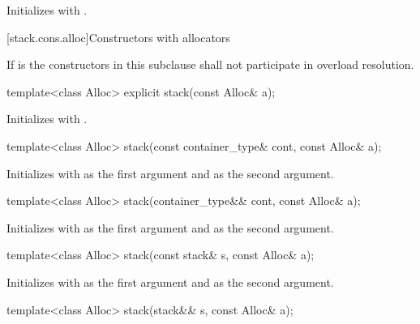 \begin{itemdescr}
\pnum
\effects
Initializes  with .
\end{itemdescr}

[stack.cons.alloc]{Constructors with allocators}

\pnum
If  is 
the constructors in this subclause shall not participate in overload resolution.

%
\begin{itemdecl}
template<class Alloc> explicit stack(const Alloc& a);
\end{itemdecl}

\begin{itemdescr}
\pnum
\effects
Initializes  with .
\end{itemdescr}

%
\begin{itemdecl}
template<class Alloc> stack(const container_type& cont, const Alloc& a);
\end{itemdecl}

\begin{itemdescr}
\pnum
\effects
Initializes  with  as the first argument and  as the
second argument.
\end{itemdescr}

%
\begin{itemdecl}
template<class Alloc> stack(container_type&& cont, const Alloc& a);
\end{itemdecl}

\begin{itemdescr}
\pnum
\effects
Initializes  with  as the first argument and 
as the second argument.
\end{itemdescr}

%
\begin{itemdecl}
template<class Alloc> stack(const stack& s, const Alloc& a);
\end{itemdecl}

\begin{itemdescr}
\pnum
\effects
Initializes  with  as the first argument and 
as the second argument.
\end{itemdescr}

%
\begin{itemdecl}
template<class Alloc> stack(stack&& s, const Alloc& a);
\end{itemdecl}

